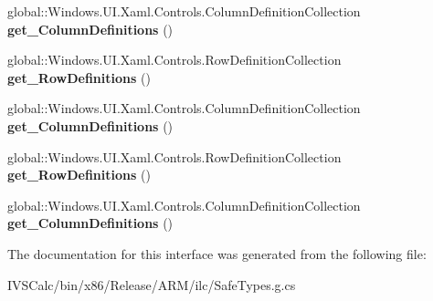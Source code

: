 \begin{DoxyCompactItemize}
\item 
\mbox{\label{interface_windows_1_1_u_i_1_1_xaml_1_1_controls_1_1_i_grid_afb59fceb5168bebefd9e755bce303150}} 
global\+::\+Windows.\+U\+I.\+Xaml.\+Controls.\+Column\+Definition\+Collection {\bfseries get\+\_\+\+Column\+Definitions} ()
\item 
\mbox{\label{interface_windows_1_1_u_i_1_1_xaml_1_1_controls_1_1_i_grid_a4b3e4f22eaf0b903f03abfab1c6fac6d}} 
global\+::\+Windows.\+U\+I.\+Xaml.\+Controls.\+Row\+Definition\+Collection {\bfseries get\+\_\+\+Row\+Definitions} ()
\item 
\mbox{\label{interface_windows_1_1_u_i_1_1_xaml_1_1_controls_1_1_i_grid_afb59fceb5168bebefd9e755bce303150}} 
global\+::\+Windows.\+U\+I.\+Xaml.\+Controls.\+Column\+Definition\+Collection {\bfseries get\+\_\+\+Column\+Definitions} ()
\item 
\mbox{\label{interface_windows_1_1_u_i_1_1_xaml_1_1_controls_1_1_i_grid_a4b3e4f22eaf0b903f03abfab1c6fac6d}} 
global\+::\+Windows.\+U\+I.\+Xaml.\+Controls.\+Row\+Definition\+Collection {\bfseries get\+\_\+\+Row\+Definitions} ()
\item 
\mbox{\label{interface_windows_1_1_u_i_1_1_xaml_1_1_controls_1_1_i_grid_afb59fceb5168bebefd9e755bce303150}} 
global\+::\+Windows.\+U\+I.\+Xaml.\+Controls.\+Column\+Definition\+Collection {\bfseries get\+\_\+\+Column\+Definitions} ()
\end{DoxyCompactItemize}


The documentation for this interface was generated from the following file\+:\begin{DoxyCompactItemize}
\item 
I\+V\+S\+Calc/bin/x86/\+Release/\+A\+R\+M/ilc/Safe\+Types.\+g.\+cs\end{DoxyCompactItemize}
